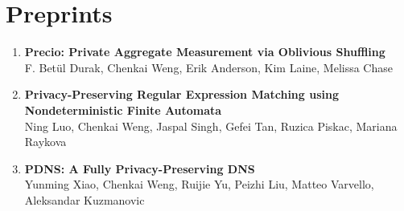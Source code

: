 \documentclass[letterpaper,11pt]{article}
\makeatletter
\newcommand{\resumeItem}[1]{
  \item\small{
    {#1 \vspace{-2pt}}
  }
}
\newcommand{\resumeProjectHeading}[2]{
    \item
    \begin{tabular*}{0.97\textwidth}{l@{\extracolsep{\fill}}r}
      \small#1 & #2 \\
    \end{tabular*}\vspace{-7pt}
}
\newcommand{\resumeSubHeadingListStart}{\begin{itemize}[leftmargin=0.15in, label={}]}
\newcommand{\resumeSubHeadingListEnd}{\end{itemize}}
\newcommand{\resumeItemListStart}{\begin{itemize}}
\newcommand{\resumeItemListEnd}{\end{itemize}\vspace{-5pt}}
\makeatother
\begin{document}

\section{Preprints}
\begin{enumerate}[leftmargin=0.20in]
  \item
    {\textbf{\small Precio: Private Aggregate Measurement via Oblivious Shuffling}} \\
		{\small F. Betül Durak, Chenkai Weng, Erik Anderson, Kim Laine, Melissa Chase \vspace{-2pt}}
  \item 
    {\textbf{\small Privacy-Preserving Regular Expression Matching using Nondeterministic Finite Automata}} \\
		{\small Ning Luo, Chenkai Weng, Jaspal Singh, Gefei Tan, Ruzica Piskac, Mariana Raykova \vspace{-2pt}}
  \item 
    {\textbf{\small PDNS: A Fully Privacy-Preserving DNS}} \\
		{\small Yunming Xiao, Chenkai Weng, Ruijie Yu, Peizhi Liu, Matteo Varvello, Aleksandar Kuzmanovic \vspace{-2pt}}

\end{enumerate}

\end{document}
